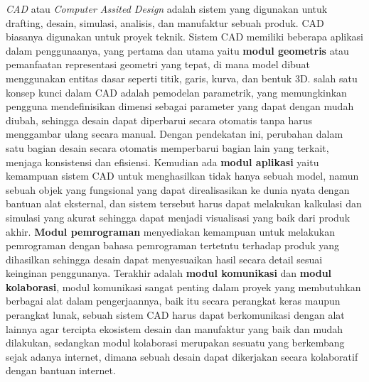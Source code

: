\textit{CAD} atau \textit{Computer Assited Design} adalah sistem yang digunakan untuk drafting, desain,
simulasi, analisis, dan manufaktur sebuah produk. CAD biasanya digunakan untuk proyek teknik. 
Sistem CAD memiliki beberapa aplikasi dalam penggunaanya, yang pertama dan utama yaitu \textbf{modul geometris} 
atau pemanfaatan representasi geometri yang tepat, di mana model dibuat menggunakan entitas dasar seperti 
titik, garis, kurva, dan bentuk 3D. salah satu konsep kunci dalam CAD adalah pemodelan parametrik, yang memungkinkan pengguna 
mendefinisikan dimensi sebagai parameter yang dapat dengan mudah diubah, sehingga desain dapat 
diperbarui secara otomatis tanpa harus menggambar ulang secara manual. Dengan pendekatan ini, 
perubahan dalam satu bagian desain secara otomatis memperbarui bagian lain yang terkait, menjaga 
konsistensi dan efisiensi. Kemudian ada \textbf{modul aplikasi} yaitu kemampuan sistem CAD untuk menghasilkan 
tidak hanya sebuah model, namun sebuah objek yang fungsional yang dapat direalisasikan ke dunia nyata
dengan bantuan alat eksternal, dan sistem tersebut harus dapat melakukan kalkulasi dan simulasi yang
akurat sehingga dapat menjadi visualisasi yang baik dari produk akhir. \textbf{Modul pemrograman} 
menyediakan kemampuan untuk melakukan pemrograman dengan bahasa pemrograman tertetntu
 terhadap produk yang dihasilkan sehingga desain 
dapat menyesuaikan hasil secara detail sesuai keinginan penggunanya. Terakhir adalah 
\textbf{modul komunikasi} dan \textbf{modul kolaborasi}, modul komunikasi sangat penting dalam 
proyek yang membutuhkan berbagai alat dalam pengerjaannya, baik itu secara perangkat keras maupun 
perangkat lunak, sebuah sistem CAD harus dapat berkomunikasi dengan alat lainnya agar tercipta
ekosistem desain dan manufaktur yang baik dan mudah dilakukan, sedangkan modul kolaborasi 
merupakan sesuatu yang berkembang sejak adanya internet, dimana sebuah desain dapat dikerjakan 
secara kolaboratif dengan bantuan internet. 

